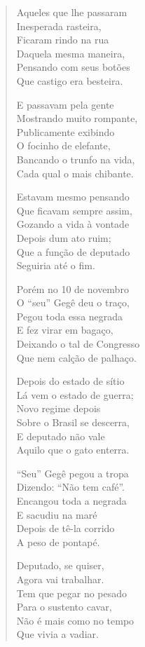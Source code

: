 \begin{verse}
Aqueles que lhe passaram\\
Inesperada rasteira,\\
Ficaram rindo na rua\\
Daquela mesma maneira,\\
Pensando com seus botões\\
Que castigo era besteira.


E passavam pela gente\\
Mostrando muito rompante,\\
Publicamente exibindo\\
O focinho de elefante,\\
Bancando o trunfo na vida,\\
Cada qual o mais chibante. 

Estavam mesmo pensando\\
Que ficavam sempre assim,\\
Gozando a vida à vontade\\
Depois dum ato ruim;\\
Que a função de deputado\\
Seguiria até o fim.

Porém no 10 de novembro\\
O “seu” Gegê deu o traço,\\
Pegou toda essa negrada\\
E fez virar em bagaço,\\
Deixando o tal de Congresso\\
Que nem calção de palhaço.

Depois do estado de sítio\\
Lá vem o estado de guerra;\\
Novo regime depois\\
Sobre o Brasil se descerra,\\
E deputado não vale\\
Aquilo que o gato enterra.


“Seu” Gegê pegou a tropa\\
Dizendo: “Não tem café”.\\
Encangou toda a negrada\\
E sacudiu na maré\\
Depois de tê-la corrido\\
A peso de pontapé.

Deputado, se quiser,\\
Agora vai trabalhar.\\
Tem que pegar no pesado\\
Para o sustento cavar,\\
Não é mais como no tempo\\
Que vivia a vadiar.


\end{verse}
